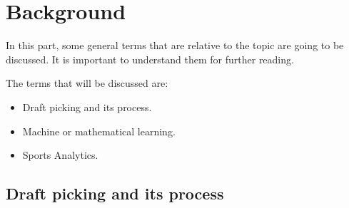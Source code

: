 \documentclass[format=sigconf]{acmart}
\begin{document}
\section{Background}
In this part, some general terms that are relative to the topic are going to be discussed. It is important to understand them for further
reading. 

The terms that will be discussed are:
\begin{itemize}
    \item  Draft picking and its process.
    \item  Machine or mathematical learning.
    \item  Sports Analytics.
\end{itemize}
\subsection{Draft picking and its process}


\end{document}
